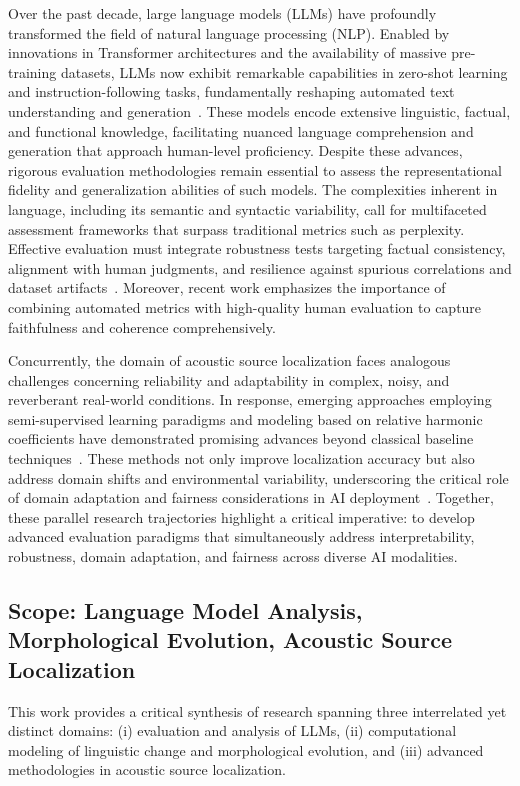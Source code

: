 \documentclass[sigconf]{acmart}
\begin{document}
Over the past decade, large language models (LLMs) have profoundly transformed the field of natural language processing (NLP). Enabled by innovations in Transformer architectures and the availability of massive pre-training datasets, LLMs now exhibit remarkable capabilities in zero-shot learning and instruction-following tasks, fundamentally reshaping automated text understanding and generation~\cite{ref10}. These models encode extensive linguistic, factual, and functional knowledge, facilitating nuanced language comprehension and generation that approach human-level proficiency. Despite these advances, rigorous evaluation methodologies remain essential to assess the representational fidelity and generalization abilities of such models. The complexities inherent in language, including its semantic and syntactic variability, call for multifaceted assessment frameworks that surpass traditional metrics such as perplexity. Effective evaluation must integrate robustness tests targeting factual consistency, alignment with human judgments, and resilience against spurious correlations and dataset artifacts~\cite{ref1,ref3}. Moreover, recent work emphasizes the importance of combining automated metrics with high-quality human evaluation to capture faithfulness and coherence comprehensively.

Concurrently, the domain of acoustic source localization faces analogous challenges concerning reliability and adaptability in complex, noisy, and reverberant real-world conditions. In response, emerging approaches employing semi-supervised learning paradigms and modeling based on relative harmonic coefficients have demonstrated promising advances beyond classical baseline techniques~\cite{ref2,ref3,ref26}. These methods not only improve localization accuracy but also address domain shifts and environmental variability, underscoring the critical role of domain adaptation and fairness considerations in AI deployment~\cite{ref26}. Together, these parallel research trajectories highlight a critical imperative: to develop advanced evaluation paradigms that simultaneously address interpretability, robustness, domain adaptation, and fairness across diverse AI modalities.

\subsection{Scope: Language Model Analysis, Morphological Evolution, Acoustic Source Localization}

This work provides a critical synthesis of research spanning three interrelated yet distinct domains: (i) evaluation and analysis of LLMs, (ii) computational modeling of linguistic change and morphological evolution, and (iii) advanced methodologies in acoustic source localization.
\end{document}
